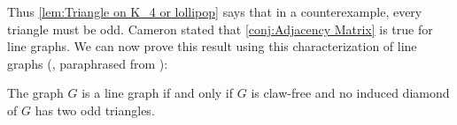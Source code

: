 Thus \autoref{lem:Triangle on K_4 or lollipop} says that in a counterexample, every triangle must be odd. Cameron stated that \autoref{conj:Adjacency Matrix} is true for line graphs. We can now prove this result using this characterization of line graphs (\cite{vRW}, paraphrased from \cite[p. 281]{West}):

\begin{theorem}
	\label{thm:vRW line graph}
	The graph $G$ is a line graph if and only if $G$ is claw-free and no induced diamond of $G$ has two odd triangles.
\end{theorem}

\begin{center}\hfill
	\hfill{}\hfill\null
\end{center}

